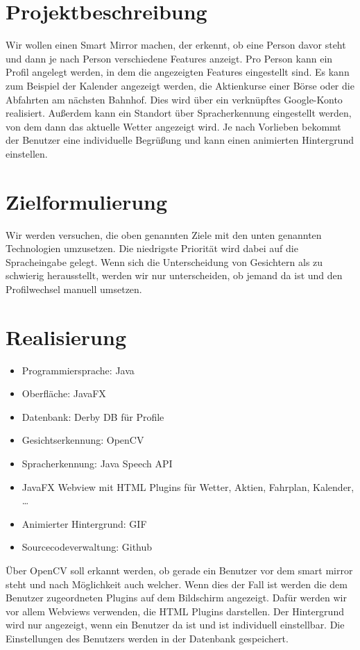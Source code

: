 \documentclass[12pt, A4]{article}
\begin{document}
\section{Projektbeschreibung}
Wir wollen einen Smart Mirror machen, der erkennt, ob eine Person davor steht und dann je nach Person verschiedene Features anzeigt. Pro Person kann ein Profil angelegt werden, in dem die angezeigten Features eingestellt sind. Es kann zum Beispiel der Kalender angezeigt werden, die Aktienkurse einer Börse oder die Abfahrten am nächsten Bahnhof. Dies wird über ein verknüpftes Google-Konto realisiert. Außerdem kann ein Standort über Spracherkennung eingestellt werden, von dem dann das aktuelle Wetter angezeigt wird. Je nach Vorlieben bekommt der Benutzer eine individuelle Begrüßung und kann einen animierten Hintergrund einstellen.

\section{Zielformulierung}
Wir werden versuchen, die oben genannten Ziele mit den unten genannten Technologien umzusetzen. Die niedrigste Priorität wird dabei auf die Spracheingabe gelegt. Wenn sich die Unterscheidung von Gesichtern als zu schwierig herausstellt, werden wir nur unterscheiden, ob jemand da ist und den Profilwechsel manuell umsetzen. 

\section{Realisierung}
\begin{itemize}
	\item Programmiersprache: Java
	\item Oberfläche: JavaFX
	\item Datenbank: Derby DB für Profile
	\item Gesichtserkennung: OpenCV
	\item Spracherkennung: Java Speech API
	\item JavaFX Webview mit HTML Plugins für Wetter, Aktien, Fahrplan, Kalender, \ldots
	\item Animierter Hintergrund: GIF
	\item Sourcecodeverwaltung: Github
\end{itemize}
Über OpenCV soll erkannt werden, ob gerade ein Benutzer vor dem smart mirror steht und nach Möglichkeit auch welcher. Wenn dies der Fall ist werden die dem Benutzer zugeordneten Plugins auf dem Bildschirm angezeigt. Dafür werden wir vor allem Webviews verwenden, die HTML Plugins darstellen. Der Hintergrund wird nur angezeigt, wenn ein Benutzer da ist und ist individuell einstellbar. Die Einstellungen des Benutzers werden in der Datenbank gespeichert. 

 
  
\end{document}
